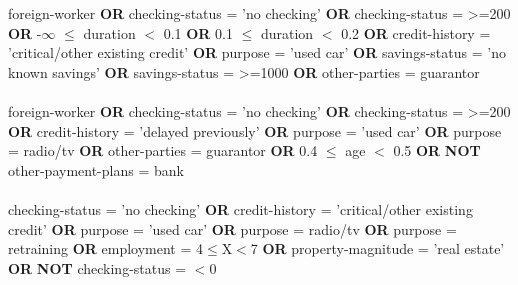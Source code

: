 \noindent foreign-worker \textbf{OR} checking-status = 'no checking' \textbf{OR} checking-status = >=200 \textbf{OR} -$\infty$ $\le$ duration $<$ 0.1 \textbf{OR} 0.1 $\le$ duration $<$ 0.2 \textbf{OR} credit-history = 'critical/other existing credit' \textbf{OR} purpose = 'used car' \textbf{OR} savings-status = 'no known savings' \textbf{OR} savings-status = >=1000 \textbf{OR} other-parties = guarantor \\\\foreign-worker \textbf{OR} checking-status = 'no checking' \textbf{OR} checking-status = >=200 \textbf{OR} credit-history = 'delayed previously' \textbf{OR} purpose = 'used car' \textbf{OR} purpose = radio/tv \textbf{OR} other-parties = guarantor \textbf{OR} 0.4 $\le$ age $<$ 0.5 \textbf{OR}  \textbf{NOT} other-payment-plans = bank \\\\checking-status = 'no checking' \textbf{OR} credit-history = 'critical/other existing credit' \textbf{OR} purpose = 'used car' \textbf{OR} purpose = radio/tv \textbf{OR} purpose = retraining \textbf{OR} employment = 4$\le$X$<$7 \textbf{OR} property-magnitude = 'real estate' \textbf{OR}  \textbf{NOT} checking-status = $<$0 \\

